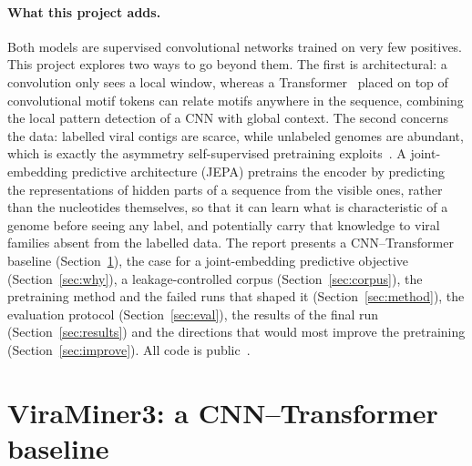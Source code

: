 \documentclass[10pt,twocolumn,a4paper]{article}
\begin{document}
\paragraph{What this project adds.}
Both models are supervised convolutional networks trained on very few positives.
This project explores two ways to go beyond them. The first is architectural: a
convolution only sees a local window, whereas a
Transformer~\cite{vaswani2017attention} placed on top of convolutional motif
tokens can relate motifs anywhere in the sequence, combining the local pattern
detection of a CNN with global context. The second concerns the data: labelled
viral contigs are scarce, while unlabeled genomes are abundant, which is exactly
the asymmetry self-supervised pretraining
exploits~\cite{ji2021dnabert,zhou2024dnabert2,dallatorre2025nt,nguyen2023hyenadna}.
A joint-embedding predictive architecture (JEPA) pretrains the encoder by
predicting the representations of hidden parts of a sequence from the visible
ones, rather than the nucleotides themselves, so that it can learn what is
characteristic of a genome before seeing any label, and potentially carry that
knowledge to viral families absent from the labelled data.
The report presents a CNN--Transformer baseline (Section~\ref{sec:vm3}), the
case for a joint-embedding predictive objective (Section~\ref{sec:why}), a
leakage-controlled corpus (Section~\ref{sec:corpus}), the pretraining method and
the failed runs that shaped it (Section~\ref{sec:method}), the evaluation
protocol (Section~\ref{sec:eval}), the results of the final run
(Section~\ref{sec:results}) and the directions that would most improve the
pretraining (Section~\ref{sec:improve}). All code is
public~\cite{grigolin2026viraminer3,grigolin2026corpus,grigolin2026viraljepa}.

\section{ViraMiner3: a CNN--Transformer baseline}\label{sec:vm3}
\end{document}
